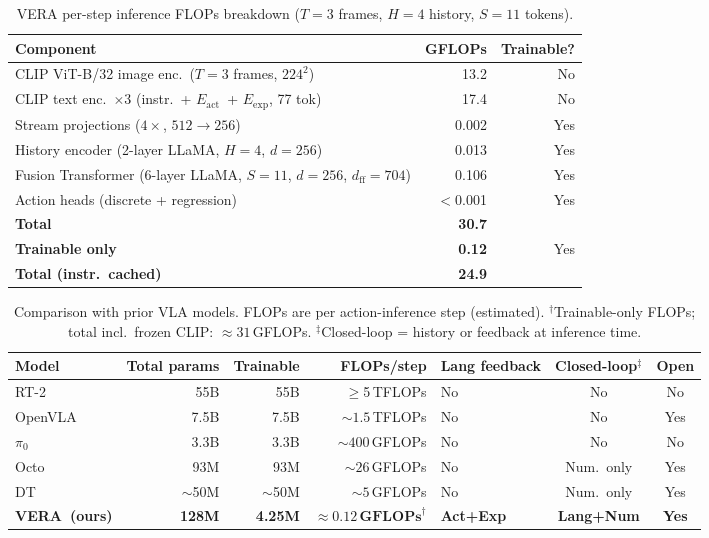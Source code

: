 \documentclass{article}
\newcommand{\modelname}{\textsc{VERA}\xspace}
\newcommand{\Lact}{$E_{\mathrm{act}}$\xspace}
\newcommand{\Lexp}{$E_{\mathrm{exp}}$\xspace}
\begin{document}
\begin{table}[h]
\centering
\caption{VERA per-step inference FLOPs breakdown ($T{=}3$ frames, $H{=}4$ history, $S{=}11$ tokens).}
\label{tab:flops}
\small
\begin{tabular}{lrr}
\toprule
\textbf{Component} & \textbf{GFLOPs} & \textbf{Trainable?} \\
\midrule
CLIP ViT-B/32 image enc.\ ($T{=}3$ frames, $224^2$) & 13.2  & No  \\
CLIP text enc.\ $\times3$ (instr.\ + \Lact\ + \Lexp, 77 tok) & 17.4  & No  \\
\midrule
Stream projections ($4\times$, $512\!\to\!256$)  & 0.002 & Yes \\
History encoder (2-layer LLaMA, $H{=}4$, $d{=}256$) & 0.013 & Yes \\
Fusion Transformer (6-layer LLaMA, $S{=}11$, $d{=}256$, $d_{\mathrm{ff}}{=}704$) & 0.106 & Yes \\
Action heads (discrete + regression)             & $<$0.001 & Yes \\
\midrule
\textbf{Total}            & \textbf{30.7}  &     \\
\textbf{Trainable only}   & \textbf{0.12}  & Yes \\
\textbf{Total (instr.\ cached)}  & \textbf{24.9} & \\
\bottomrule
\end{tabular}
\end{table}

\begin{table}[h]
\centering
\caption{Comparison with prior VLA models.
  FLOPs are per action-inference step (estimated).
  $^\dagger$Trainable-only FLOPs; total incl.\ frozen CLIP: ${\approx}31$\,GFLOPs.
  $^\ddagger$Closed-loop = history or feedback at inference time.}
\label{tab:comparison}
\small
\setlength{\tabcolsep}{4pt}
\begin{tabular}{lrrrlcc}
\toprule
\textbf{Model} & \textbf{Total params} & \textbf{Trainable} & \textbf{FLOPs/step}
               & \textbf{Lang feedback} & \textbf{Closed-loop$^\ddagger$} & \textbf{Open} \\
\midrule
RT-2~\citep{brohan2023rt2}     & 55B  & 55B   & $\ge$5\,TFLOPs   & No  & No          & No  \\
OpenVLA~\citep{kim2024openvla} & 7.5B & 7.5B  & ${\sim}1.5$\,TFLOPs & No & No        & Yes \\
$\pi_0$~\citep{black2024pi0}   & 3.3B & 3.3B  & ${\sim}400$\,GFLOPs & No & No        & No  \\
Octo~\citep{octo2024}          & 93M  & 93M   & ${\sim}26$\,GFLOPs  & No & Num.\ only & Yes \\
DT~\citep{chen2021decision}    & ${\sim}$50M & ${\sim}$50M & ${\sim}5$\,GFLOPs & No & Num.\ only & Yes \\
\midrule
\textbf{\modelname\ (ours)}    & \textbf{128M} & \textbf{4.25M}
                               & $\mathbf{{\approx}0.12\,\text{GFLOPs}}^\dagger$
                               & \textbf{Act+Exp} & \textbf{Lang+Num} & \textbf{Yes} \\
\bottomrule
\end{tabular}
\end{table}
\end{document}
